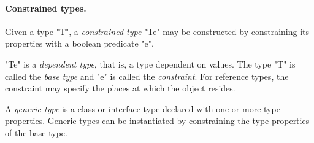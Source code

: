\paragraph{Constrained types.}
        Given a type \xcd"T", a {\em constrained type}
        \xcd"T{e}" may be
        constructed by constraining its properties with a
        boolean predicate \xcd"e".

        \xcd"T{e}" is a {\em dependent type}, that is, a type
        dependent on values.
        The type \xcd"T" is called the
        {\em base type} and \xcd"e" is called the {\em constraint}.
        For reference types, the constraint may
        specify the places at which the object resides.

        A {\em generic type} is a class or interface type
        declared with one or more type properties.  Generic
        types can be instantiated by constraining the type
        properties of the base type.



